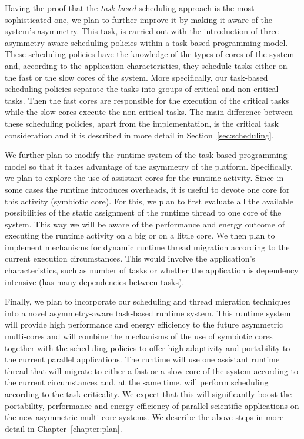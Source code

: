 Having the proof that the \textit{task-based} scheduling approach is the most sophisticated one, we plan to further improve it by making it aware of the system's asymmetry.
This task, is carried out with the introduction of three asymmetry-aware scheduling policies within a task-based programming model.
These scheduling policies have the knowledge of the types of cores of the system and, according to the application characteristics, they schedule tasks either on the fast or the slow cores of the system.
More specifically, our task-based scheduling policies separate the tasks into groups of critical and non-critical tasks.
Then the fast cores are responsible for the execution of the critical tasks while the slow cores execute the non-critical tasks.
The main difference between these scheduling policies, apart from the implementation, is the critical task consideration and it is described in more detail in Section~\ref{sec:scheduling}.

We further plan to modify the runtime system of the task-based programming model so that it takes advantage of the asymmetry of the platform.
Specifically, we plan to explore the use of assistant cores for the runtime activity. 
Since in some cases the runtime introduces overheads, it is useful to devote one core for this activity (symbiotic core).
For this, we plan to first evaluate all the available possibilities of the static assignment of the runtime thread to one core of the system.
This way we will be aware of the performance and energy outcome of executing the runtime activity on a big or on a little core.
We then plan to implement mechanisms for dynamic runtime thread migration according to the current execution circumstances.
This would involve the application's characteristics, such as number of tasks or whether the application is dependency intensive (has many dependencies between tasks).

Finally, we plan to incorporate our scheduling and thread migration techniques into a novel asymmetry-aware task-based runtime system.
This runtime system will provide high performance and energy efficiency to the future asymmetric multi-cores and will combine the mechanisms of the use of symbiotic cores together with the scheduling policies to offer high adaptivity and portability to the current parallel applications.
The runtime will use one assistant runtime thread that will migrate to either a fast or a slow core of the system according to the current circumstances and, at the same time, will perform scheduling according to the task criticality.
We expect that this will significantly boost the portability, performance and energy efficiency of parallel scientific applications on the new asymmetric multi-core systems.
We describe the above steps in more detail in Chapter~\ref{chapter:plan}.


